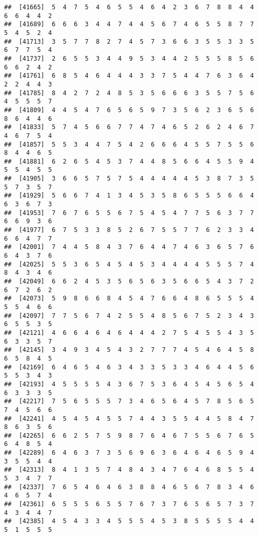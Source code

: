 \documentclass[
]{book}
\begin{document}
\begin{verbatim}
##  [41665]  5  4  7  5  4  6  5  5  4  6  4  2  3  6  7  8  8  4  4  6  6  4  4  2
##  [41689]  6  6  6  3  4  4  7  4  4  5  6  7  4  6  5  5  8  7  7  5  4  5  2  4
##  [41713]  3  5  7  7  8  2  7  4  5  7  3  6  6  3  5  5  3  3  5  6  7  7  5  4
##  [41737]  2  6  5  5  3  4  4  9  5  3  4  4  2  5  5  5  8  5  6  6  6  2  4  2
##  [41761]  6  8  5  4  6  4  4  4  3  3  7  5  4  4  7  6  3  6  4  2  2  4  4  3
##  [41785]  8  4  2  7  2  4  8  5  3  5  6  6  6  3  5  5  7  5  6  4  5  5  5  7
##  [41809]  4  4  5  4  7  6  5  6  5  9  7  3  5  6  2  3  6  5  6  8  6  4  4  6
##  [41833]  5  7  4  5  6  6  7  7  4  7  4  6  5  2  6  2  4  6  7  4  6  7  5  4
##  [41857]  5  5  3  4  4  7  5  4  2  6  6  6  4  5  5  7  5  5  6  8  4  4  6  5
##  [41881]  6  2  6  5  4  5  3  7  4  4  8  5  6  6  4  5  5  9  4  5  5  4  5  5
##  [41905]  3  6  6  5  7  5  7  5  4  4  4  4  4  5  3  8  7  3  5  5  7  3  5  7
##  [41929]  5  6  6  7  4  1  3  4  5  3  5  8  6  5  5  5  6  6  4  6  3  6  7  3
##  [41953]  7  6  7  6  5  5  6  7  5  4  5  4  7  7  5  6  3  7  7  6  6  9  3  6
##  [41977]  6  7  5  3  3  8  5  2  6  7  5  5  7  7  6  2  3  3  4  6  6  4  7  7
##  [42001]  7  4  4  5  8  4  3  7  6  4  4  7  4  6  3  6  5  7  6  6  4  3  7  6
##  [42025]  5  5  3  6  5  4  5  4  5  3  4  4  4  4  5  5  5  7  4  8  4  3  4  6
##  [42049]  6  6  2  4  5  3  5  6  5  6  3  5  6  6  5  4  3  7  2  6  7  2  6  2
##  [42073]  5  9  8  6  6  8  4  5  4  7  6  6  4  8  6  5  5  5  4  5  5  4  6  6
##  [42097]  7  7  5  6  7  4  2  5  5  4  8  5  6  7  5  2  3  4  3  6  5  5  3  5
##  [42121]  4  6  6  4  6  4  6  4  4  4  2  7  5  4  5  5  4  3  5  6  3  3  5  7
##  [42145]  3  4  9  3  4  5  4  3  2  7  7  7  4  5  4  6  4  5  8  6  5  8  4  5
##  [42169]  6  4  6  5  4  6  3  4  3  3  5  3  3  4  6  4  4  5  6  5  5  3  4  3
##  [42193]  4  5  5  5  5  4  3  6  7  5  3  6  4  5  4  5  6  5  4  6  3  3  3  5
##  [42217]  7  5  6  5  5  5  7  3  4  6  5  6  4  5  7  8  5  6  5  7  4  5  6  6
##  [42241]  4  5  4  5  4  5  5  7  4  4  3  5  5  4  4  5  8  4  7  8  6  3  5  6
##  [42265]  6  6  2  5  7  5  9  8  7  6  4  6  7  5  5  6  7  6  5  6  4  8  5  4
##  [42289]  6  4  6  3  7  3  5  6  9  6  3  6  4  6  4  6  5  9  4  3  5  5  4  4
##  [42313]  8  4  1  3  5  7  4  8  4  3  4  7  6  4  6  8  5  5  4  5  3  4  7  7
##  [42337]  7  6  5  4  6  4  6  3  8  8  4  6  5  6  7  8  3  4  6  4  6  5  7  4
##  [42361]  6  5  5  5  6  5  5  7  6  7  3  7  6  5  6  5  7  3  7  4  3  4  4  7
##  [42385]  4  5  4  3  3  4  5  5  5  4  5  3  8  5  5  5  5  4  4  5  1  5  5  5

\end{verbatim}
\end{document}

